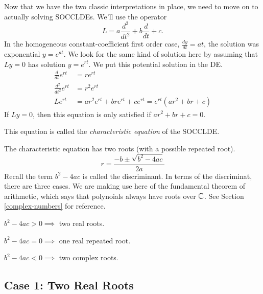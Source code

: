 \documentclass[fleqn,letterpaper]{report}
\begin{document}
Now that we have the two classic interpretations in place, we
need to move on to actually solving SOCCLDEs. We'll use the
operator
\begin{equation*}
L = a \frac{d^2}{dt^2} + b \frac{d}{dt} + c.
\end{equation*}
In the homogeneous constant-coefficient first order case,
$\frac{dy}{dt} = at$, the solution was exponential $y =
e^{at}$. We look for the same kind of solution here by
assuming that $Ly =0$ has solution $y = e^{r t}$. We
put this potential solution in the DE.
\begin{align*}
\frac{d}{dt} e^{r t} & = r e^{r t} \\
\frac{d^2}{dt^2} e^{r t} & = r^2 e^{r t} \\
L e^{r t} & = a r^2 e^{rt} + br e^{rt} + ce^{rt} = e^{rt}
(ar^2 + br + c)
\end{align*}
If $Ly = 0$, then this equation is only satisfied if $ar^2 +
br + c = 0$. 

\begin{defn}
This equation is called the \emph{characteristic equation} of
the SOCCLDE. 
\end{defn}

The characteristic equation has two roots (with a possible
repeated root).
\begin{equation*}
r = \frac{-b \pm \sqrt{b^2-4ac}}{2a}
\end{equation*}
Recall the term $b^2 -4ac$ is called the discriminant. In
terms of the discriminat, there are three cases. We are making
use here of the fundamental theorem of arithmetic, which says
that polynoials always have roots over $\mathbb{C}$.  See Section
\ref{complex-numbers} for reference.

\begin{smallparts}
\item $b^2 -4ac > 0 \implies$ two real roots.
\item $b^2 -4ac = 0 \implies$ one real repeated root.
\item $b^2 -4ac < 0 \implies$ two complex roots. 
\end{smallparts}

\subsection{Case 1: Two Real Roots}
\label{two-real-roots}
\end{document}
